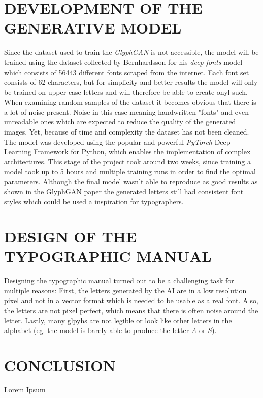 \documentclass[11pt]{article}
\begin{document}
\section{DEVELOPMENT OF THE GENERATIVE MODEL}
Since the dataset used to train the \emph{GlyphGAN} is not accessible, the model will be trained using the dataset collected by Bernhardsson for his \emph{deep-fonts} model which consists of 56443 different fonts scraped from the internet. Each font set consists of 62 characters, but for simplicity and better results the model will only be trained on upper-case letters and will therefore be able to create onyl such. When examining random samples of the dataset it becomes obvious that there is a lot of noise present. Noise in this case meaning handwritten "fonts" and even unreadable ones which are expected to reduce the quality of the generated images. Yet, because of time and complexity the dataset has not been cleaned.
The model was developed using the popular and powerful \emph{PyTorch} Deep Learning Framework for Python, which enables the implementation of complex architectures.
This stage of the project took around two weeks, since training a model took up to 5 hours and multiple training runs in order to find the optimal parameters. Although the final model wasn't able to reproduce as good results as shown in the GlyphGAN paper the generated letters still had consistent font styles which could be used a inspiration for typographers.

\section{DESIGN OF THE TYPOGRAPHIC MANUAL}
Designing the typographic manual turned out to be a challenging task for multiple reasons: First, the letters generated by the AI are in a low resolution pixel and not in a vector format which is needed to be usable as a real font. Also, the letters are not pixel perfect, which means that there is often noise around the letter.
Lastly, many glpyhs are not legible or look like other letters in the alphabet (eg. the model is barely able to produce the letter \emph{A} or \emph{S}).

\pagebreak
\section{CONCLUSION}
Lorem Ipsum \\
\end{document}
